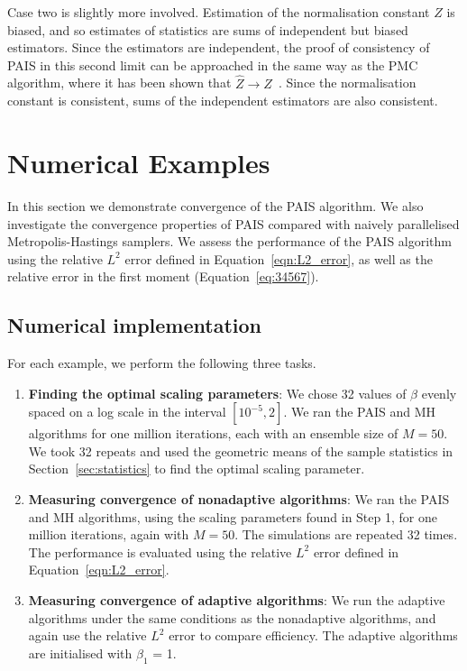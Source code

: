 \documentclass[final]{siamltex}
\begin{document}
Case two is slightly more involved. Estimation of the normalisation constant $Z$ is biased, and so estimates of statistics are sums of independent but biased estimators. Since the estimators are independent, the proof of consistency of PAIS in this second limit can be approached in the same way as the PMC algorithm, where it has been shown that $\hat{Z}\rightarrow Z$~\cite{robert2013monte}. Since the normalisation constant is consistent, sums of the independent estimators are also consistent.


\section{Numerical Examples}\label{Sec:Num}

In this section we demonstrate convergence of the PAIS algorithm. We
also investigate the convergence properties of PAIS compared with
naively parallelised Metropolis-Hastings samplers. We assess the
performance of the PAIS algorithm using the relative $L^2$ error
defined in Equation~\eqref{eqn:L2_error}, as well as the relative error in the
first moment (Equation~\eqref{eq:34567}).


\subsection{Numerical implementation}
\label{sec:Implementation P1}

For each example, we perform the following three tasks.

\begin{enumerate}
	\item {\bf Finding the optimal scaling parameters}: We chose 32 values of $\beta$ evenly spaced on a log scale in the interval $[10^{-5}, 2]$. We ran the PAIS and MH algorithms for one million iterations, each with an ensemble size of $M=50$. We took 32 repeats and used the geometric means of the sample statistics in Section~\ref{sec:statistics} to find the optimal scaling parameter.
	\item {\bf Measuring convergence of nonadaptive algorithms}: We ran the PAIS and MH algorithms, using the scaling parameters found in Step 1, for one million iterations, again with $M=50$. The simulations are repeated 32 times. The performance is evaluated using the relative $L^2$ error defined in Equation~\eqref{eqn:L2_error}.
	\item {\bf Measuring convergence of adaptive algorithms}: We run the
adaptive algorithms under the same conditions as the nonadaptive
algorithms, and again use the relative $L^2$ error to compare
efficiency. The adaptive algorithms are initialised with $\beta_1$ = 1.
\end{enumerate}
\end{document}
